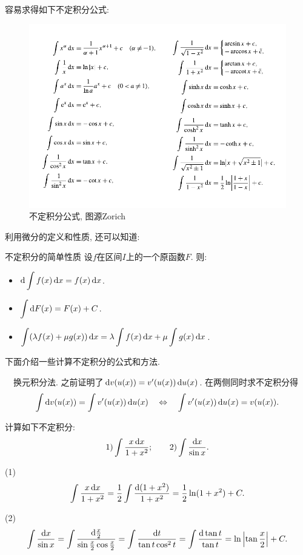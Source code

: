 容易求得如下不定积分公式: 

\begin{figure}[H]
	\centering
	\includegraphics[width=14cm]{attachment/不定积分表.pdf}
	\caption{不定积分公式, 图源Zorich}
\end{figure}

利用微分的定义和性质, 还可以知道: 

\begin{proposition}{不定积分的简单性质}
	设$f$在区间$I$上的一个原函数$F$. 则: 
	\begin{itemize}
		\item $\displaystyle \mathop{}\!\mathrm{d} \int f(x) \mathop{}\!\mathrm{d} x = f(x) \mathop{}\!\mathrm{d} x$. 
		\item $\displaystyle \int \mathop{}\!\mathrm{d} F(x) = F(x) + C$. 
		\item $\displaystyle \int (\lambda f(x)+ \mu g(x)) \mathop{}\!\mathrm{d} x = \lambda \int f(x) \mathop{}\!\mathrm{d} x + \mu \int g(x) \mathop{}\!\mathrm{d} x$. 
	\end{itemize}
\end{proposition}

下面介绍一些计算不定积分的公式和方法. 

~~换元积分法. 之前证明了$\mathop{}\!\mathrm{d} v(u(x)) = v'(u(x)) \mathop{}\!\mathrm{d} u(x)$. 在两侧同时求不定积分得$$\int \mathop{}\!\mathrm{d} v(u(x)) = \int v'(u(x)) \mathop{}\!\mathrm{d} u(x) \quad \Leftrightarrow \quad \int v'(u(x)) \mathop{}\!\mathrm{d} u(x) = v(u(x)). $$

\begin{example}
	计算如下不定积分: $$1) \int \frac{x\mathop{}\!\mathrm{d} x}{1+x^2};\qquad 2) \int \frac{\mathop{}\!\mathrm{d} x}{\sin x}. $$
\end{example}
\begin{solution}
	(1) $$\int \frac{x\mathop{}\!\mathrm{d} x}{1+x^2} = \frac{1}{2} \int \frac{\mathop{}\!\mathrm{d} (1+x^2)}{1+x^2} = \frac{1}{2}\ln (1+x^2) +C.$$
	
	(2) $$\int \frac{\mathop{}\!\mathrm{d} x}{\sin x} = \int \frac{\mathop{}\!\mathrm{d} \frac{x}{2}}{\sin \frac{x}{2} \cos \frac{x}{2}} = \int \frac{\mathop{}\!\mathrm{d} t}{\tan t \cos ^2 t} = \int \frac{\mathop{}\!\mathrm{d} \tan t}{\tan t} = \ln \left| \tan \frac{x}{2} \right| + C.$$
\end{solution}

